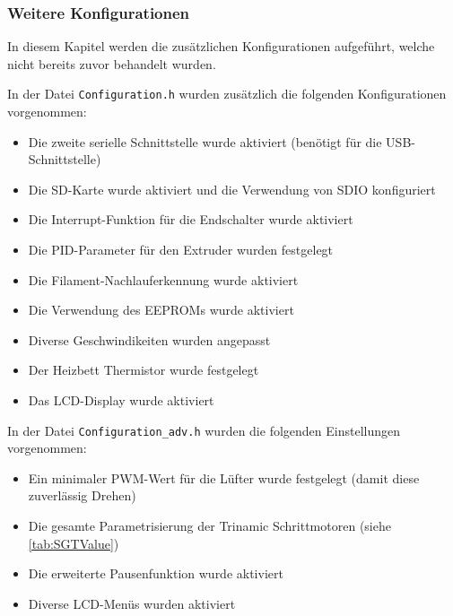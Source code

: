\subsubsection{Weitere Konfigurationen}
\label{sec:Weitere_Konfigurationen}

In diesem Kapitel werden die zusätzlichen Konfigurationen aufgeführt, welche nicht bereits zuvor behandelt wurden.

In der Datei \texttt{Configuration.h} wurden zusätzlich die folgenden Konfigurationen vorgenommen:

\begin{itemize}
	\item Die zweite serielle Schnittstelle wurde aktiviert (benötigt für die USB-Schnittstelle)
	\item Die SD-Karte wurde aktiviert und die Verwendung von SDIO konfiguriert
	\item Die Interrupt-Funktion für die Endschalter wurde aktiviert
	\item Die PID-Parameter für den Extruder wurden festgelegt
	\item Die Filament-Nachlauferkennung wurde aktiviert
	\item Die Verwendung des EEPROMs wurde aktiviert
	\item Diverse Geschwindikeiten wurden angepasst
	\item Der Heizbett Thermistor wurde festgelegt
	\item Das LCD-Display wurde aktiviert
\end{itemize}

In der Datei \texttt{Configuration\_adv.h} wurden die folgenden Einstellungen vorgenommen:

\begin{itemize}
	\item Ein minimaler PWM-Wert für die Lüfter wurde festgelegt (damit diese zuverlässig Drehen)
	\item Die gesamte Parametrisierung der Trinamic Schrittmotoren (siehe \ref{tab:SGTValue})
	\item Die erweiterte Pausenfunktion wurde aktiviert
	\item Diverse LCD-Menüs wurden aktiviert
\end{itemize}
